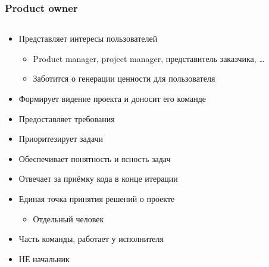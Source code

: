 \documentclass{../../slides-style}
\begin{document}
    \begin{frame}
        \frametitle{Product owner}
        \begin{columns}
            \begin{column}{0.7\textwidth}
                \begin{itemize}
                    \item Представляет интересы пользователей
                    \begin{itemize}
                        \item Product manager, project manager, представитель заказчика, \dots
                        \item Заботится о генерации ценности для пользователя
                    \end{itemize}
                    \item Формирует видение проекта и доносит его команде
                    \item Предоставляет требования
                    \item Приоритезирует задачи
                    \item Обеспечивает понятность и ясность задач
                    \item Отвечает за приёмку кода в конце итерации
                    \item Единая точка принятия решений о проекте
                    \begin{itemize}
                        \item Отдельный человек
                    \end{itemize}
                    \item Часть команды, работает у исполнителя
                    \item НЕ начальник
                \end{itemize}
            \end{column}
            \begin{column}{0.3\textwidth}
                \strut
                \begin{center}

\end{center}
\end{column}
\end{columns}
\end{frame}
\end{document}
